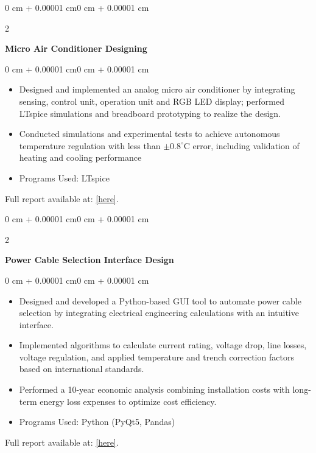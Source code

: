 \documentclass[10pt, letterpaper]{article}
\newenvironment{highlights}{
    \begin{itemize}[
        topsep=0.10 cm,
        parsep=0.10 cm,
        partopsep=0pt,
        itemsep=0pt,
        leftmargin=0 cm + 10pt
    ]
}{
    \end{itemize}
} %
\newenvironment{onecolentry}{
    \begin{adjustwidth}{0 cm + 0.00001 cm}{0 cm + 0.00001 cm}
}{
    \end{adjustwidth}
} %
\newenvironment{twocolentry}[2][]{
    \onecolentry
    \def\secondColumn{#2}
    \setcolumnwidth{\fill, 4.5 cm}
    \begin{paracol}{2}
}{
    \switchcolumn \raggedleft \secondColumn
    \end{paracol}
    \endonecolentry
} %
\begin{document}
\vspace{0.2 cm}

\begin{twocolentry}{}
    \textbf{Micro Air Conditioner Designing}
\end{twocolentry}

\vspace{0.10 cm}
\begin{onecolentry}
    \begin{highlights}
        \item Designed and implemented an analog micro air conditioner by integrating sensing, control unit, operation unit and RGB LED display; performed LTspice simulations and breadboard prototyping to realize the design.
        \item Conducted simulations and experimental tests to achieve autonomous temperature regulation with less than $\pm 0.8^\circ$C error, including validation of heating and cooling performance 
        \item  Programs Used: LTspice
    \end{highlights}
    Full report available at: \href{https://drive.google.com/file/d/14LxSZs8bfI0C_sf_S6rY0oO5PZYFHFg2/view}{[here]}.
\end{onecolentry}

\vspace{0.2 cm}
\begin{twocolentry}{}
    \textbf{Power Cable Selection Interface Design}
\end{twocolentry}

\vspace{0.10 cm}
\begin{onecolentry}
    \begin{highlights}
        \item Designed and developed a Python-based GUI tool to automate power cable selection by integrating electrical engineering calculations with an intuitive interface.
        \item Implemented algorithms to calculate current rating, voltage drop, line losses, voltage regulation, and applied temperature and trench correction factors based on international standards.
        \item Performed a 10-year economic analysis combining installation costs with long-term energy loss expenses to optimize cost efficiency.
        \item Programs Used: Python (PyQt5, Pandas)
    \end{highlights}
    Full report available at: \href{https://drive.google.com/file/d/16f8ijAeEyLVm5ekeazxyMJRlgb9_2rDH/view}{[here]}.
\end{onecolentry}
\end{document}
